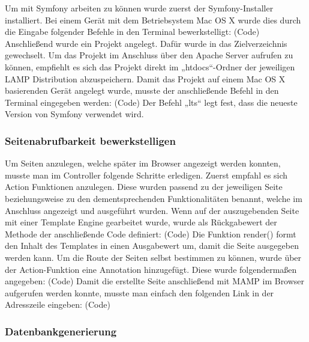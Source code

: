 	Um mit Symfony arbeiten zu können wurde zuerst der Symfony-Installer installiert. Bei einem Gerät mit dem Betriebsystem Mac OS X wurde dies durch die Eingabe folgender Befehle in den Terminal bewerkstelligt:
	(Code)
	Anschließend wurde ein Projekt angelegt. Dafür wurde in das Zielverzeichnis gewechselt. Um das Projekt im Anschluss über den Apache Server aufrufen zu können, empfiehlt es sich das Projekt direkt im „htdocs“-Ordner der jeweiligen LAMP Distribution abzuspeichern. Damit das Projekt auf einem Mac OS X basierenden Gerät angelegt wurde, musste der anschließende Befehl in den Terminal eingegeben werden:
	(Code)
	Der Befehl „lts“ legt fest, dass die neueste Version von Symfony verwendet wird.

    \subsubsection{Seitenabrufbarkeit bewerkstelligen}

	Um Seiten anzulegen, welche später im Browser angezeigt werden konnten, musste man im Controller folgende Schritte erledigen. Zuerst empfahl es sich Action Funktionen anzulegen. Diese wurden passend zu der jeweiligen Seite beziehungsweise zu den dementsprechenden Funktionalitäten benannt, welche im Anschluss angezeigt und ausgeführt wurden. Wenn auf der auszugebenden Seite mit einer Template Engine gearbeitet wurde, wurde als Rückgabewert der Methode der anschließende Code definiert:
	(Code)
	Die Funktion render() formt den Inhalt des Templates in einen Ausgabewert um, damit die Seite  ausgegeben werden kann.
	Um die Route der Seiten selbst bestimmen zu können, wurde über der Action-Funktion eine Annotation hinzugefügt. Diese wurde folgendermaßen angegeben:
	(Code)
	Damit die erstellte Seite anschließend mit MAMP im Browser aufgerufen werden konnte, musste man einfach den folgenden Link in der Adresszeile eingeben:
	(Code)


    \subsubsection{Datenbankgenerierung}

